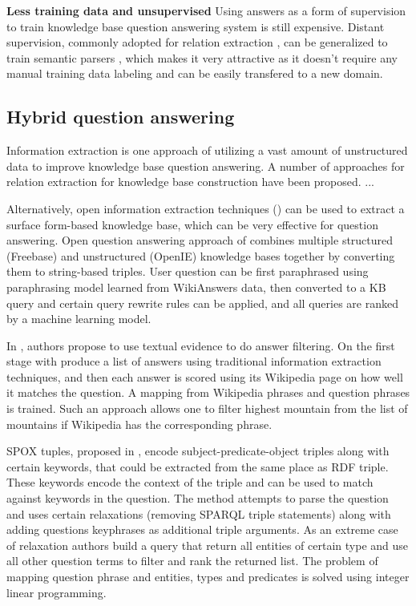 \textbf{Less training data and unsupervised}
Using answers as a form of supervision to train knowledge base question answering system is still expensive.
Distant supervision, commonly adopted for relation extraction \cite{MintzBSJ09}, can be generalized to train semantic parsers \cite{ReddyLS14}, which makes it very attractive as it doesn't require any manual training data labeling and can be easily transfered to a new domain.

\subsection{Hybrid question answering}

Information extraction is one approach of utilizing a vast amount of unstructured data to improve knowledge base question answering.
A number of approaches for relation extraction for knowledge base construction have been proposed.
...

Alternatively, open information extraction techniques (\cite{Etzioni:2008:OIE:1409360.1409378}) can be used to extract a surface form-based knowledge base, which can be very effective for question answering.
Open question answering approach of \cite{Fader:2014:OQA:2623330.2623677} combines multiple structured (Freebase) and unstructured (OpenIE) knowledge bases together by converting them to string-based triples.
User question can be first paraphrased using paraphrasing model learned from WikiAnswers data, then converted to a KB query and certain query rewrite rules can be applied, and all queries are ranked by a machine learning model.

In \cite{xu2016enhancing}, authors propose to use textual evidence to do answer filtering.
On the first stage with produce a list of answers using traditional information extraction techniques, and then each answer is scored using its Wikipedia page on how well it matches the question. A mapping from Wikipedia phrases and question phrases is trained.
Such an approach allows one to filter highest mountain from the list of mountains if Wikipedia has the corresponding phrase.

SPOX tuples, proposed in \cite{yahya2013robust}, encode subject-predicate-object triples along with certain keywords, that could be extracted from the same place as RDF triple.
These keywords encode the context of the triple and can be used to match against keywords in the question. The method attempts to parse the question and uses certain relaxations (removing SPARQL triple statements) along with adding questions keyphrases as additional triple arguments.
As an extreme case of relaxation authors build a query that return all entities of certain type and use all other question terms to filter and rank the returned list.
The problem of mapping question phrase and entities, types and predicates is solved using integer linear programming.



